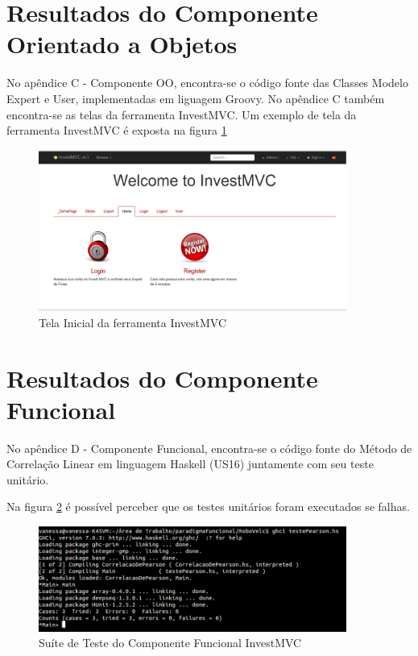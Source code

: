 \section{Resultados do Componente Orientado a Objetos}
No apêndice C - Componente OO, encontra-se o código fonte das Classes Modelo Expert e User, implementadas em liguagem Groovy. No apêndice C também encontra-se as telas da ferramenta InvestMVC. Um exemplo de tela da ferramenta InvestMVC é exposta na figura \ref{telaInicial}

\begin{figure}[H]
\centering
\includegraphics[width=0.9\textwidth]{figuras/telaInicial}
\caption{Tela Inicial da ferramenta InvestMVC}
\label{telaInicial}
\end{figure}

\section{Resultados do Componente Funcional}
No apêndice D - Componente Funcional, encontra-se o código fonte do Método de Correlação Linear em linguagem Haskell (US16) juntamente com seu teste unitário.

Na figura \ref{testeHaskel} é possível perceber que os testes unitários foram executados se falhas.
 
\begin{figure}[H]
\centering
\includegraphics[width=0.9\textwidth]{figuras/testeHaskel}
\caption{Suíte de Teste do Componente Funcional InvestMVC}
\label{testeHaskel}
\end{figure}

